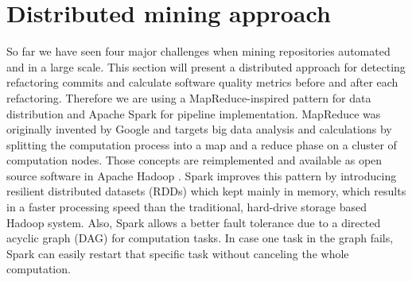 \documentclass[conference]{IEEEtran}
\begin{document}
\section{Distributed mining approach}
So far we have seen four major challenges when mining repositories automated and in a large scale. This section will present a distributed approach for detecting refactoring commits and calculate software quality metrics before and after each refactoring. Therefore we are using a MapReduce-inspired pattern for data distribution and Apache Spark for pipeline implementation. MapReduce was originally invented by Google and targets big data analysis and calculations by splitting the computation process into a map and a reduce phase \cite{mapreduce2008} on a cluster of computation nodes. Those concepts are reimplemented and available as open source software in Apache Hadoop \cite{hadoop}. Spark improves this pattern by introducing resilient distributed datasets (RDDs) which kept mainly in memory, which results in a faster processing speed than the traditional, hard-drive storage based Hadoop system. Also, Spark allows a better fault tolerance due to a directed acyclic graph (DAG) for computation tasks. In case one task in the graph fails, Spark can easily restart that specific task without canceling the whole computation.
\end{document}
